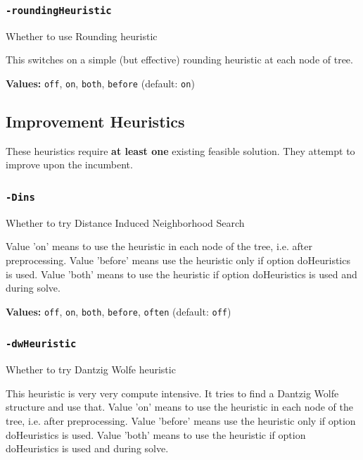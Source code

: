 \documentclass[11pt,a4paper]{article}
\begin{document}
\subsubsection*{\texttt{-roundingHeuristic}}

Whether to use Rounding heuristic

This switches on a simple (but effective) rounding heuristic at each node of tree.

\textbf{Values:} \texttt{off}, \texttt{on}, \texttt{both}, \texttt{before} (default: \texttt{on})

\subsection{Improvement Heuristics}

These heuristics require \textbf{at least one} existing feasible solution. They attempt to improve upon the incumbent.

\subsubsection*{\texttt{-Dins}}

Whether to try Distance Induced Neighborhood Search

Value 'on' means to use the heuristic in each node of the tree, i.e. after preprocessing. Value 'before' means use the heuristic only if option doHeuristics is used. Value 'both' means to use the heuristic if option doHeuristics is used and during solve.

\textbf{Values:} \texttt{off}, \texttt{on}, \texttt{both}, \texttt{before}, \texttt{often} (default: \texttt{off})

\subsubsection*{\texttt{-dwHeuristic}}

Whether to try Dantzig Wolfe heuristic

This heuristic is very very compute intensive. It tries to find a Dantzig Wolfe structure and use that. Value 'on' means to use the heuristic in each node of the tree, i.e. after preprocessing. Value 'before' means use the heuristic only if option doHeuristics is used. Value 'both' means to use the heuristic if option doHeuristics is used and during solve.
\end{document}

